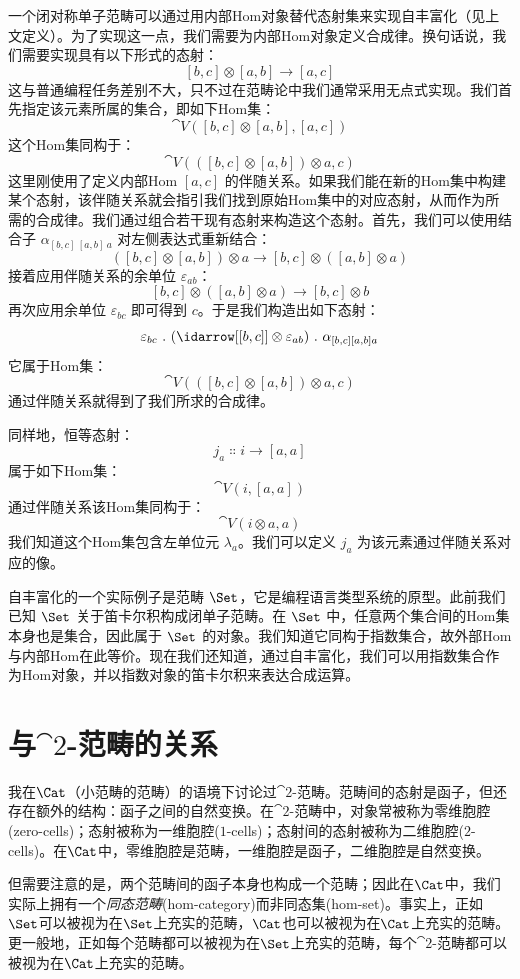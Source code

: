 一个闭对称单子范畴可以通过用内部Hom对象替代态射集来实现自丰富化（见上文定义）。为了实现这一点，我们需要为内部Hom对象定义合成律。换句话说，我们需要实现具有以下形式的态射：
$$[b, c] \otimes [a, b] \to [a, c]$$
这与普通编程任务差别不大，只不过在范畴论中我们通常采用无点式实现。我们首先指定该元素所属的集合，即如下Hom集：
$$\cat{V}([b, c] \otimes [a, b], [a, c])$$
这个Hom集同构于：
$$\cat{V}(([b, c] \otimes [a, b]) \otimes a, c)$$
这里刚使用了定义内部Hom $[a, c]$ 的伴随关系。如果我们能在新的Hom集中构建某个态射，该伴随关系就会指引我们找到原始Hom集中的对应态射，从而作为所需的合成律。我们通过组合若干现有态射来构造这个态射。首先，我们可以使用结合子 $\alpha_{[b, c]\ [a, b]\ a}$ 对左侧表达式重新结合：
$$([b, c] \otimes [a, b]) \otimes a \to [b, c] \otimes ([a, b] \otimes a)$$
接着应用伴随关系的余单位 $\varepsilon_{a b}$：
$$[b, c] \otimes ([a, b] \otimes a) \to [b, c] \otimes b$$
再次应用余单位 $\varepsilon_{b c}$ 即可得到 $c$。于是我们构造出如下态射：
$$\varepsilon_{b c}\ .\ (\idarrow[{[b, c]}] \otimes \varepsilon_{a b})\ .\ \alpha_{[b, c] [a, b] a}$$
它属于Hom集：
$$\cat{V}(([b, c] \otimes [a, b]) \otimes a, c)$$
通过伴随关系就得到了我们所求的合成律。

同样地，恒等态射：
$$j_a \Colon i \to [a, a]$$
属于如下Hom集：
$$\cat{V}(i, [a, a])$$
通过伴随关系该Hom集同构于：
$$\cat{V}(i \otimes a, a)$$
我们知道这个Hom集包含左单位元 $\lambda_a$。我们可以定义 $j_a$ 为该元素通过伴随关系对应的像。

自丰富化的一个实际例子是范畴 $\Set$，它是编程语言类型系统的原型。此前我们已知 $\Set$ 关于笛卡尔积构成闭单子范畴。在 $\Set$ 中，任意两个集合间的Hom集本身也是集合，因此属于 $\Set$ 的对象。我们知道它同构于指数集合，故外部Hom与内部Hom在此等价。现在我们还知道，通过自丰富化，我们可以用指数集合作为Hom对象，并以指数对象的笛卡尔积来表达合成运算。

\section{与$\cat{2}$-范畴的关系}

我在$\Cat$（小范畴的范畴）的语境下讨论过$\cat{2}$-范畴。范畴间的态射是函子，但还存在额外的结构：函子之间的自然变换。在$\cat{2}$-范畴中，对象常被称为零维胞腔(zero-cells)；态射被称为一维胞腔($1$-cells)；态射间的态射被称为二维胞腔($2$-cells)。在$\Cat$中，零维胞腔是范畴，一维胞腔是函子，二维胞腔是自然变换。

但需要注意的是，两个范畴间的函子本身也构成一个范畴；因此在$\Cat$中，我们实际上拥有一个\emph{同态范畴}(hom-category)而非同态集(hom-set)。事实上，正如$\Set$可以被视为在$\Set$上充实的范畴，$\Cat$也可以被视为在$\Cat$上充实的范畴。更一般地，正如每个范畴都可以被视为在$\Set$上充实的范畴，每个$\cat{2}$-范畴都可以被视为在$\Cat$上充实的范畴。